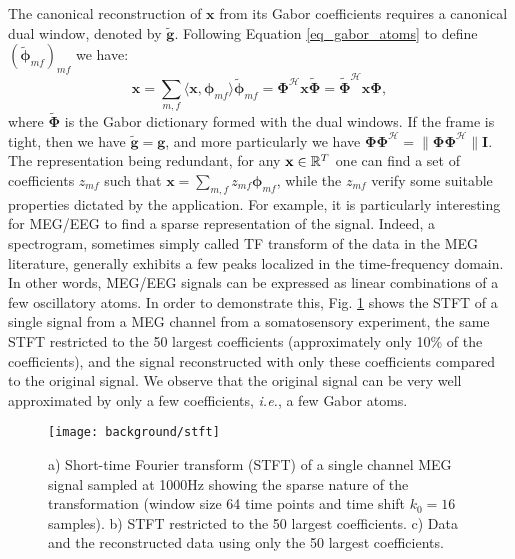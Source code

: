 The canonical reconstruction of $\mathbf{x}$ from its Gabor coefficients requires a canonical dual window, denoted by $\mathbf{\tilde{g}}$. Following Equation \eqref{eq_gabor_atoms} to define $(\tilde{\mathbf{\phi}}_{mf})_{mf}$ we have:
\begin{equation} \label{eq_TF_recons}
	\mathbf{x}=\sum_{m,f}\langle\mathbf{x}, \mathbf{\phi}_{mf}\rangle\tilde{\mathbf{\phi}}_{mf}=\mathbf{\Phi}^{\mathcal{H}}\mathbf{x\tilde{\Phi}}=\tilde{\mathbf{\Phi}}^{\mathcal{H}}\mathbf{x\Phi},
\end{equation}
where $\tilde{\mathbf{\Phi}}$ is the Gabor dictionary formed with the dual windows. If the frame is tight, then we have $\tilde{\mathbf{g}}=\mathbf{g}$, and more particularly we have $\mathbf{\Phi\Phi}^{\mathcal{H}}=\|\mathbf{\Phi\Phi}^{\mathcal{H}}\|\mathbf{I}$. The representation being redundant, for any $\mathbf{x}\in\mathbb{R}^T$ one can find a set of coefficients $z_{mf}$ such that $\mathbf{x}=\sum_{m,f}z_{mf}\mathbf{\phi}_{mf}$, while the $z_{mf}$ verify some suitable properties dictated by the application. For example, it is particularly interesting for MEG/EEG to find a sparse representation of the signal. Indeed, a spectrogram, sometimes simply called TF transform of the data in the MEG literature, generally exhibits a few peaks localized in the time-frequency domain. In other words, MEG/EEG signals can be expressed as linear combinations of a few oscillatory atoms. In order to demonstrate this, Fig. \ref{fig:stft} shows the STFT of a single signal from a MEG channel from a somatosensory experiment, the same STFT restricted to the 50 largest coefficients (approximately only 10\% of the coefficients), and the signal reconstructed with only these coefficients compared to the original signal. We observe that the original signal can be very well approximated by only a few coefficients, \textit{i.e.}, a few Gabor atoms.

\begin{figure}
\centering
	\texttt{[image: background/stft]}
    \caption{a) Short-time Fourier transform (STFT) of a single channel MEG signal sampled at 1000Hz showing the sparse nature of the transformation (window size 64 time points and time shift $k_0=16$ samples). b) STFT restricted to the 50 largest coefficients. c) Data and the reconstructed data using only the 50 largest coefficients.}
	\label{fig:stft}
\end{figure}


